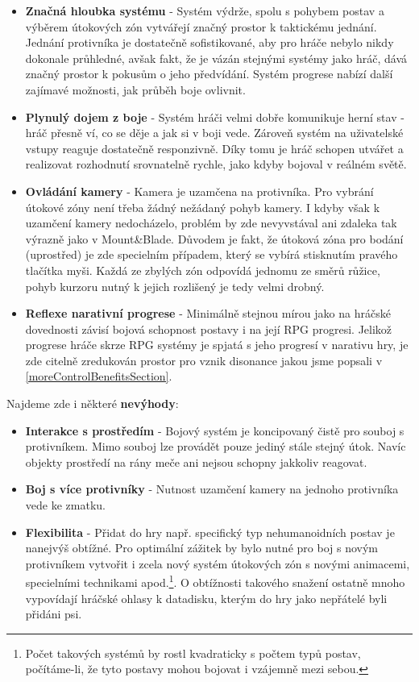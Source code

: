 \begin{itemize}
    \item \textbf{Značná hloubka systému} - Systém výdrže, spolu s pohybem postav a výběrem útokových zón vytvářejí značný prostor k taktickému jednání. Jednání protivníka je dostatečně sofistikované, aby pro hráče nebylo nikdy dokonale průhledné, avšak fakt, že je vázán stejnými systémy jako hráč, dává značný prostor k pokusům o jeho předvídání. Systém progrese nabízí další zajímavé možnosti, jak průběh boje ovlivnit. 
    \item \textbf{Plynulý dojem z boje} - Systém hráči velmi dobře komunikuje herní stav - hráč přesně ví, co se děje a jak si v boji vede. Zároveň systém na uživatelské vstupy reaguje dostatečně responzivně. Díky tomu je hráč schopen utvářet a realizovat rozhodnutí srovnatelně rychle, jako kdyby bojoval v reálném světě.
    \item \textbf{Ovládání kamery} - Kamera je uzamčena na protivníka. Pro vybrání útokové zóny není třeba žádný nežádaný pohyb kamery. I kdyby však k uzamčení kamery nedocházelo, problém by zde nevyvstával ani zdaleka tak výrazně jako v Mount\&Blade. Důvodem je fakt, že útoková zóna pro bodání (uprostřed) je zde specielním případem, který se vybírá stisknutím pravého tlačítka myši. Každá ze zbylých zón odpovídá jednomu ze směrů růžice, pohyb kurzoru nutný k jejich rozlišený je tedy velmi drobný. 
    \item \textbf{Reflexe narativní progrese} - Minimálně stejnou mírou jako na hráčské dovednosti závisí bojová schopnost postavy i na její \acs{RPG} progresi. Jelikož progrese hráče skrze \acs{RPG} systémy je spjatá s jeho progresí v narativu hry, je zde citelně zredukován prostor pro vznik disonance jakou jsme popsali v \ref{moreControlBenefitsSection}.
\end{itemize}

Najdeme zde i některé \textbf{nevýhody}:
\begin{itemize}
    \item \textbf{Interakce s prostředím} - Bojový systém je koncipovaný čistě pro souboj s protivníkem. Mimo souboj lze provádět pouze jediný stále stejný útok. Navíc objekty prostředí na rány meče ani nejsou schopny jakkoliv reagovat.  
    \item \textbf{Boj s více protivníky} - Nutnost uzamčení kamery na jednoho protivníka vede ke zmatku.
    \item \textbf{Flexibilita} - Přidat do hry např. specifický typ nehumanoidních postav je nanejvýš obtížné. Pro optimální zážitek by bylo nutné pro boj s novým protivníkem vytvořit i zcela nový systém útokových zón s novými animacemi, specielními technikami apod.\footnote{Počet takových systémů by rostl kvadraticky s počtem typů postav, počítáme-li, že tyto postavy mohou bojovat i vzájemně mezi sebou.}. O obtížnosti takového snažení ostatně mnoho vypovídají hráčské ohlasy k datadisku, kterým do hry jako nepřátelé byli přidáni psi.  
\end{itemize}

